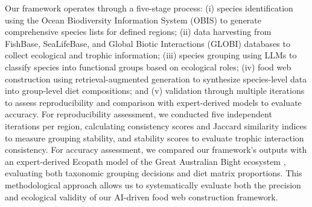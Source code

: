 Our framework operates through a five-stage process: (i) species identification using the Ocean Biodiversity Information System (OBIS) to generate comprehensive species lists for defined regions; (ii) data harvesting from FishBase, SeaLifeBase, and Global Biotic Interactions (GLOBI) databases to collect ecological and trophic information; (iii) species grouping using LLMs to classify species into functional groups based on ecological roles; (iv) food web construction using retrieval-augmented generation to synthesize species-level data into group-level diet compositions; and (v) validation through multiple iterations to assess reproducibility and comparison with expert-derived models to evaluate accuracy. For reproducibility assessment, we conducted five independent iterations per region, calculating consistency scores and Jaccard similarity indices to measure grouping stability, and stability scores to evaluate trophic interaction consistency. For accuracy assessment, we compared our framework's outputs with an expert-derived Ecopath model of the Great Australian Bight ecosystem \citep{Fulton2018}, evaluating both taxonomic grouping decisions and diet matrix proportions. This methodological approach allows us to systematically evaluate both the precision and ecological validity of our AI-driven food web construction framework.
